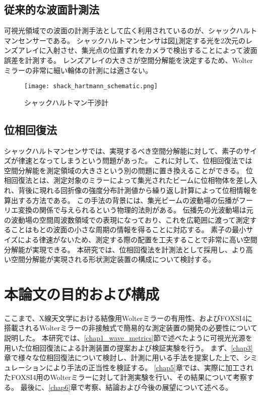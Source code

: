 \subsection{従来的な波面計測法}
\label{chap1_conventional_wave_metrics}
可視光領域での波面の計測手法として広く利用されているのが、シャックハルトマンセンサーである。
シャックハルトマンセンサは図\ref{fig:shack_hartmann_schematic}測定する光を2次元のレンズアレイに入射させ、集光点の位置ずれをカメラで検出することによって波面誤差を計測する。
レンズアレイの大きさが空間分解能を決定するため、Wolterミラーの非常に細い輪体の計測には適さない。

\begin{figure}[h]
\centering
\texttt{[image: shack\_hartmann\_schematic.png]}
\caption{シャックハルトマン干渉計}
\label{fig:shack_hartmann_schematic}
\end{figure}

\subsection{位相回復法}
シャックハルトマンセンサでは、実現するべき空間分解能に対して、素子のサイズが律速となってしまうという問題があった。
これに対して、位相回復法では空間分解能を測定領域の大きさという別の問題に置き換えることができる。
位相回復法とは、測定対象のミラーによって集光されたビームに位相物体を差し入れ、背後に現れる回折像の強度分布計測値から繰り返し計算によって位相情報を算出する方法である。
この手法の背景には、集光ビームの波動場の伝播がフーリエ変換の関係で与えられるという物理的法則がある。
伝播先の光波動場は元の波動場の空間周波数領域での表現になっており、これを広範囲に渡って測定することはもとの波面の小さな周期の情報を得ることに対応する。
素子の最小サイズによる律速がないため、測定する際の配置を工夫することで非常に高い空間分解能が実現できる。
本研究では、位相回復法を計測法として採用し、より高い空間分解能が実現される形状測定装置の構成について検討する。

\clearpage
\newpage

\section{本論文の目的および構成}
\label{chap1_purpose}

ここまで、X線天文学における結像用Wolterミラーの有用性、およびFOXSI4に搭載されるWolterミラーの非接触式で簡易的な測定装置の開発の必要性について説明した。
本研究では、\ref{chap1_wave_metrics}節で述べたように可視光光源を用いた位相回復法による計測装置の提案および検証実験を行う。
まず、\ref{chap3}章で様々な位相回復法について検討し、計測に用いる手法を提案した上で、シミュレーションにより手法の正当性を検証する。
\ref{chap5}章では、実際に加工されたFOXSI4用のWolterミラーに対して計測実験を行い、その結果について考察する。
最後に、\ref{chap6}章で考察、結論および今後の展望について述べる。

